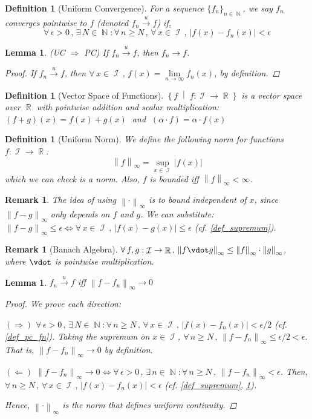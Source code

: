 \documentclass[12pt]{article}
\let\RA\Rightarrow
\let\LA\Leftarrow
\let\LR\Leftrightarrow
\let\ee\epsilon
\newcommand{\set}[2]{\left\{{#1}\;\middle|\;{#2}\right\}}
\newcommand{\Forall}[1]{\forall\,{#1}\,,\,}
\newcommand{\Exist}[1]{\exists\,{#1}:}
\DeclareMathOperator{\R}{\mathbb{R}}
\DeclareMathOperator{\N}{\mathbb{N}}
\DeclareMathOperator{\I}{\mathcal{I}}
\newcommand{\seq}[2]{\{{#1}\}_{#2\in\N}}
\newcommand{\fsup}[1]{\left\|#1\right\|_\infty}
\newcommand{\uto}[0]{\overset{\displaystyle u}{\longrightarrow}}
\newtheorem{definition}[theorem]{Definition}
\newtheorem{lemma}[theorem]{Lemma}
\newtheorem{remark}[theorem]{Remark}
\begin{document}
\begin{definition}[Uniform Convergence]
  \label{def_uc_fn}
  For a sequence $\seq{f_n}{n}$, we say $f_n$ converges pointwise to $f$ (denoted $f_n\uto f$) if, $$\Forall{\ee>0}\Exist{N\in\N}\Forall{n\geq N}\Forall{x\in\I}|f(x)-f_n(x)|<\ee$$
\end{definition}

\begin{lemma}(UC $\RA$ PC)
  \label{uc_implies_pc}
  If $f_n\uto f$, then $f_n\to f$.
  \begin{proof}
    If $f_n\uto f$, then $\Forall{x\in\I} f(x)=\lim\limits_{n\to\infty}f_n(x)$, by definition.
  \end{proof}
\end{lemma}

\begin{definition}[Vector Space of Functions]
  $\set{f}{f:\I\to\R}$ is a vector space over $\R$ with pointwise addition and scalar multiplication:
  $(f+g)(x)=f(x)+g(x)\;$ and $\;(\alpha\cdot f)=\alpha\cdot f(x)$
\end{definition}

\begin{definition}[Uniform Norm]
  We define the following norm for functions $f:\I\to\R$:
  $$\fsup{f}= \sup\limits_{x\in\I}|f(x)|$$ which we can check is a norm. Also, $f$ is bounded iff $\fsup{f}<\infty$.
\end{definition}

\begin{remark}
  \label{sup_exchange}
  The idea of using $\fsup{\cdot}$ is to bound independent of $x$, since $\fsup{f-g}$ only depends on $f$ and $g$. We can substitute: $\fsup{f-g}\leq\ee\LR \Forall{x\in\I}|f(x)-g(x)|\leq\ee$ (cf. \ref{def_supremum}).
\end{remark}

\begin{remark}[Banach Algebra]
  $\Forall{f,g:\I\to\R}\fsup{f\vdot g}\leq \fsup{f}\cdot \fsup{g}$, where $\vdot$ is pointwise multiplication.
\end{remark}

\begin{lemma}
  \label{uc_normed}
  $f_n\uto f$ iff $\fsup{f-f_n}\to 0$
  \begin{proof}
    We prove each direction:
    \begin{compactitem}
      \item[$(\RA)$] $\Forall{\ee>0}\Exist{N\in\N}\Forall{n\geq N}\Forall{x\in\I}|f(x)-f_n(x)|<\ee/2$ (cf. \ref{def_pc_fn}). Taking the supremum on $x\in\I$, $\Forall{n\geq N}\fsup{f-f_n}\leq \ee/2<\ee$. That is, $\fsup{f-f_n}\to 0$ by definition.
      \item[$(\LA)$] $\fsup{f-f_n}\to 0\LR \Forall{\ee>0}\Exist{n\in\N}\Forall{n\geq N}\fsup{f-f_n}<\ee$. Then, $\Forall{n\geq N}\Forall{x\in\I}|f(x)-f_n(x)|<\ee$ (cf. \ref{def_supremum}, \ref{sup_exchange}).
    \end{compactitem}
    Hence, $\fsup{\cdot}$ is the norm that defines uniform continuity.
  \end{proof}
\end{lemma}
\end{document}
